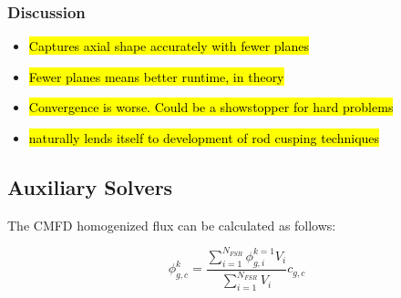\begin{table}
\caption{Comparison of subplane scheme to traditional 2D/1D for VERA Progression Problem 5}
\begin{center}
\end{center}
\end{table}

\subsubsection{Discussion}

\begin{itemize}
\item \hl{Captures axial shape accurately with fewer planes}
\item \hl{Fewer planes means better runtime, in theory}
\item \hl{Convergence is worse.  Could be a showstopper for hard problems}
\item \hl{naturally lends itself to development of rod cusping techniques}
\end{itemize}


\subsection{Auxiliary Solvers}

The CMFD homogenized flux can be calculated as follows:

\begin{equation}\label{e:CMFDsubplaneFlux}
\phi^k_{g,c} = \frac{\sum_{i=1}^{N_{FSR}} \phi^{k=1}_{g,i} V_i}{\sum_{i=1}^{N_{FSR}} V_i} c_{g,c}
\end{equation}


